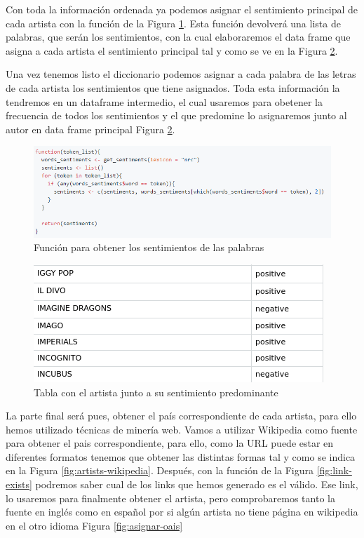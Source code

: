 Con toda la información ordenada ya podemos asignar el sentimiento principal de cada artista con la función de la Figura \ref{fig:lista-sentimientos}. Esta función devolverá una lista de palabras, que serán los sentimientos, con la cual elaboraremos el data frame que asigna a cada artista el sentimiento principal tal y como se ve en la Figura \ref{fig:artista-sentimiento}.

Una vez tenemos listo el diccionario podemos asignar a cada palabra de las letras de cada artista los sentimientos que tiene asignados. Toda esta información la tendremos en un dataframe intermedio, el cual usaremos para obetener la frecuencia de todos los sentimientos y el que predomine lo asignaremos junto al autor en data frame principal Figura \ref{fig:artista-sentimiento}.

\begin{figure}[h]
	\centering
	\includegraphics[width=0.7\linewidth]{Imagenes/lista-sentimientos}
	\caption{Función para obtener los sentimientos de las palabras}
	\label{fig:lista-sentimientos}
\end{figure}

\begin{figure}[h]
	\centering
	\includegraphics[width=0.7\linewidth]{Imagenes/artista-sentimiento}
	\caption{Tabla con el artista junto a su sentimiento predominante}
	\label{fig:artista-sentimiento}
\end{figure}


La parte final será pues, obtener el país correspondiente de cada artista, para ello hemos utilizado técnicas de minería web. Vamos a utilizar Wikipedia como fuente para obtener el pais correspondiente, para ello, como la URL puede estar en diferentes formatos tenemos que obtener las distintas formas tal y como se indica en la Figura \ref{fig:artists-wikipedia}. Después, con la función de la Figura \ref{fig:link-exists} podremos saber cual de los links que hemos generado es el válido. Ese link, lo usaremos para finalmente obtener el artista, pero comprobaremos tanto la fuente en inglés como en español por si algún artista no tiene página en wikipedia en el otro idioma Figura \ref{fig:asignar-oais}

